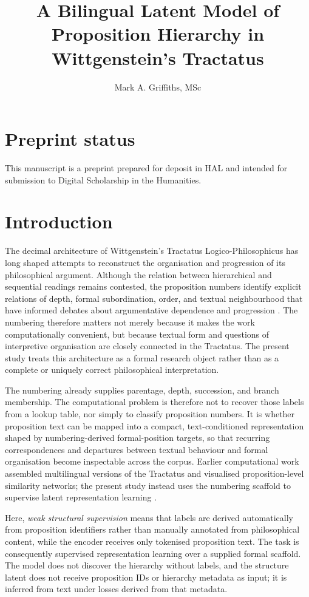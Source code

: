 \documentclass[webpdf,modern,medium,namedate]{oup-authoring-template}
\title[A Bilingual Latent Model of Proposition Hierarchy]{A Bilingual Latent Model of Proposition Hierarchy in Wittgenstein's Tractatus}
\author[1,$\ast$]{Mark A. Griffiths, MSc}
\begin{document}
\maketitle

\section*{Preprint status}
This manuscript is a preprint prepared for deposit in HAL and intended for submission to Digital Scholarship in the Humanities.

\section{Introduction}
The decimal architecture of Wittgenstein's Tractatus Logico-Philosophicus has long shaped attempts to reconstruct the organisation and progression of its philosophical argument. Although the relation between hierarchical and sequential readings remains contested, the proposition numbers identify explicit relations of depth, formal subordination, order, and textual neighbourhood that have informed debates about argumentative dependence and progression \citep{wittgenstein1922tractatus,hacker2015tractatus,kraft2016tractatus}. The numbering therefore matters not merely because it makes the work computationally convenient, but because textual form and questions of interpretive organisation are closely connected in the Tractatus. The present study treats this architecture as a formal research object rather than as a complete or uniquely correct philosophical interpretation.

The numbering already supplies parentage, depth, succession, and branch membership. The computational problem is therefore not to recover those labels from a lookup table, nor simply to classify proposition numbers. It is whether proposition text can be mapped into a compact, text-conditioned representation shaped by numbering-derived formal-position targets, so that recurring correspondences and departures between textual behaviour and formal organisation become inspectable across the corpus. Earlier computational work assembled multilingual versions of the Tractatus and visualised proposition-level similarity networks; the present study instead uses the numbering scaffold to supervise latent representation learning \citep{bucur2016tractatus}.

Here, \emph{weak structural supervision} means that labels are derived automatically from proposition identifiers rather than manually annotated from philosophical content, while the encoder receives only tokenised proposition text. The task is consequently supervised representation learning over a supplied formal scaffold. The model does not discover the hierarchy without labels, and the structure latent does not receive proposition IDs or hierarchy metadata as input; it is inferred from text under losses derived from that metadata.
\end{document}
